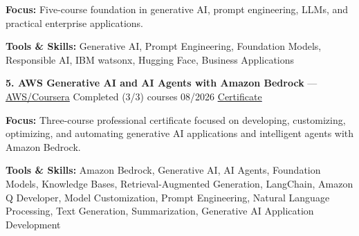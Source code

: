 \documentclass[9pt,letterpaper]{extarticle}
\begin{document}
\textbf{Focus:} Five-course foundation in generative AI, prompt engineering, LLMs, and practical enterprise applications.\par
{\small\textbf{Tools \& Skills:} Generative AI, Prompt Engineering, Foundation Models, Responsible AI, IBM watsonx, Hugging Face, Business Applications\par}
\vspace{2pt}
\noindent\textbf{5. AWS Generative AI and AI Agents with Amazon Bedrock} {\small --- \textcolor{blue}{\underline{\href{https://coursera.org/verify/professional-cert/XMNOUZNOW9M0}{AWS/Coursera}}} \textbar{} Completed (3/3) courses \textbar{} 08/2026 \textbar{} \textcolor{blue}{\underline{\href{https://waseemraza844.github.io/portfolio/certificates/genai/aws-bedrock/aws-generative-ai-agents-amazon-bedrock.pdf}{Certificate}}}}\par
\textbf{Focus:} Three-course professional certificate focused on developing, customizing, optimizing, and automating generative AI applications and intelligent agents with Amazon Bedrock.\par
{\small\textbf{Tools \& Skills:} Amazon Bedrock, Generative AI, AI Agents, Foundation Models, Knowledge Bases, Retrieval-Augmented Generation, LangChain, Amazon Q Developer, Model Customization, Prompt Engineering, Natural Language Processing, Text Generation, Summarization, Generative AI Application Development\par}
\vspace{2pt}
\end{document}
